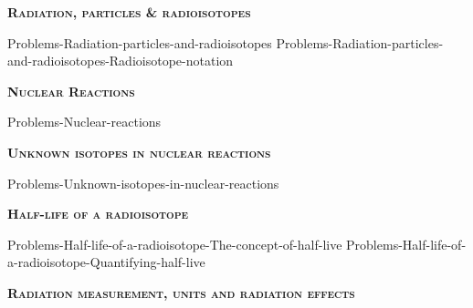 \documentclass[main.tex]{subfiles}
\newcommand\chapterlabel{Ch-nuclear}
\begin{document}
\newpage
\setdoublesep{0.35700 em}  %
\setatomsep{1.78500 em}    %
\setbondoffset{0.18265 em} %
\renewcommand{\bondwidth}{0.06642 em} %
\setbondstyle{line width = \bondwidth}
\fancyhfoffset[E,O]{0pt}
\setlength{\columnsep}{30pt}
\begin{conclusion}
\iftoggle{chem121}{}{\setcounter{chapter}{9}}
\iftoggle{chem121}{\setcounter{chapter}{4}}{}
\end{conclusion}
\begin{multicols*}{2}\setcounter{numA}{1}  %






{\raggedright\textsc{\textbf{Radiation, particles \& radioisotopes }}\par}

{Problems-Radiation-particles-and-radioisotopes}
{Problems-Radiation-particles-and-radioisotopes-Radioisotope-notation}







{\raggedright\textsc{\textbf{Nuclear Reactions }}\par}

{Problems-Nuclear-reactions}

  

 {\raggedright\textsc{\textbf{Unknown isotopes in nuclear reactions }}\par}



{Problems-Unknown-isotopes-in-nuclear-reactions}





{\raggedright\textsc{\textbf{Half-life of a radioisotope }}\par}
{Problems-Half-life-of-a-radioisotope-The-concept-of-half-live}
{Problems-Half-life-of-a-radioisotope-Quantifying-half-live}

 
{\raggedright\textsc{\textbf{ Radiation measurement, units and radiation effects }}\par}


\end{multicols*}
\end{document}
